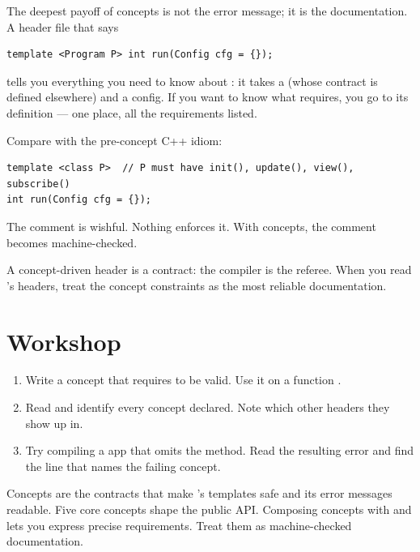 The deepest payoff of concepts is not the error message; it is
the documentation. A header file that says

\begin{lstlisting}
template <Program P> int run(Config cfg = {});
\end{lstlisting}

tells you everything you need to know about : it takes
a  (whose contract is defined elsewhere) and a
config. If you want to know what  requires, you go
to its definition --- one place, all the requirements listed.

Compare with the pre-concept C++ idiom:

\begin{lstlisting}
template <class P>  // P must have init(), update(), view(), subscribe()
int run(Config cfg = {});
\end{lstlisting}

The comment is wishful. Nothing enforces it. With concepts, the
comment becomes machine-checked.

\begin{idea}
A concept-driven header is a contract: the compiler is the
referee. When you read \maya{}'s headers, treat the concept
constraints as the most reliable documentation.
\end{idea}

\section*{Workshop}

\begin{enumerate}[leftmargin=*]
  \item Write a concept  that requires
     to be valid. Use it on a function
    .
  \item Read
     and identify
    every concept declared. Note which other headers they show
    up in.
  \item Try compiling a  app that omits the
     method. Read the resulting error and find
    the line that names the failing concept.
\end{enumerate}

\begin{recap}
Concepts are the contracts that make \maya{}'s templates safe and
its error messages readable. Five core concepts shape the public
API. Composing concepts with \code{\&\&} and \code{||} lets you
express precise requirements. Treat them as machine-checked
documentation.
\end{recap}
